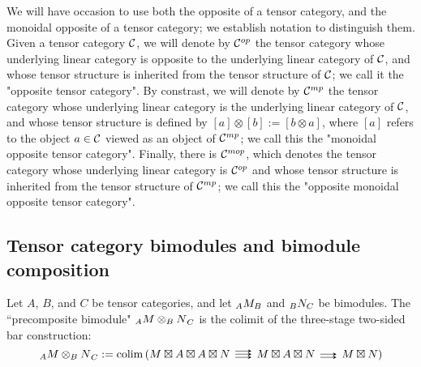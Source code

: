 \documentclass{amsart}
\begin{document}
We will have occasion to use both the opposite of a tensor category, and the monoidal opposite of a tensor category; we establish notation to distinguish them.  Given a tensor category $\mathcal C$, we will denote by $\mathcal C^{op}$ the tensor category whose underlying linear category is opposite to the underlying linear category of $\mathcal C$, and whose tensor structure is inherited from the tensor structure of $\mathcal C$; we call it the "opposite tensor category".  By constrast, we will denote by $\mathcal C^{mp}$ the tensor category whose underlying linear category is the underlying linear category of $\mathcal C$, and whose tensor structure is defined by $[a] \otimes [b] := [b \otimes a]$, where $[a]$ refers to the object $a \in \mathcal C$ viewed as an object of $\mathcal C^{mp}$; we call this the "monoidal opposite tensor category".  Finally, there is $\mathcal C^{mop}$, which denotes the tensor category whose underlying linear category is $\mathcal C^{op}$ and whose tensor structure is inherited from the tensor structure of $\mathcal C^{mp}$; we call this the "opposite monoidal opposite tensor category".

\subsection{Tensor category bimodules and bimodule composition} \label{sec-tc-bimod}


\begin{definition}
\end{definition}

\begin{definition}
Let $A$, $B$, and $C$ be tensor categories, and let ${}_{A} {M}_{B}$ and ${}_{B} {N}_{C}$ be bimodules.  The ``precomposite bimodule" ${}_{A} {M \otimes_B N}_{C}$ is the colimit of the three-stage two-sided bar construction:
\begin{equation} \nn
\bimod{A}{M \otimes_B N}{C} := \colim \left( M \dtimes A \dtimes A \dtimes N \righttriplearrows M \dtimes A \dtimes N \rightdoublearrows M \dtimes N \right)
\end{equation}
\end{definition}
\end{document}

